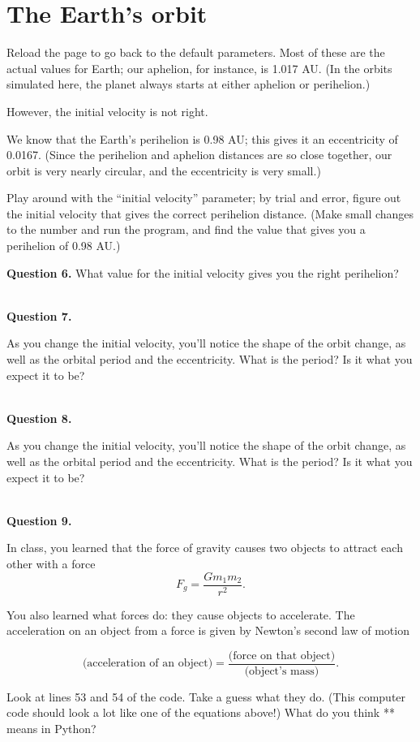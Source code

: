 \documentclass[11pt]{article}
\begin{document}
\section{The Earth's orbit}

Reload the page to go back to the default parameters. Most of these are the actual values for Earth; our aphelion, for instance, is 1.017 AU. (In the orbits simulated here, the planet always starts at either aphelion or perihelion.) 

However, the initial velocity is not right.

We know that the Earth's perihelion is 0.98 AU; this gives it an eccentricity of 0.0167. (Since the perihelion and aphelion distances are so close together, our orbit is very nearly circular, and the eccentricity is very small.)

Play around with the ``initial velocity'' parameter; by trial and error, figure out the initial velocity that gives the correct perihelion distance. (Make small changes to the number and run the program, and find the value that gives you a perihelion of 0.98 AU.)

\medskip

{\textbf{Question 6.} What value for the initial velocity gives you the right perihelion?}

\vspace*{1.5cm}
\hrulefill\\

\textbf{Question 7.} 

As you change the initial velocity, you'll notice the shape of the orbit change, as well as the orbital period and the eccentricity. What is the period? Is it what you expect it to be?

\vspace*{1.5cm}
\hrulefill\\

\textbf{Question 8.} 

As you change the initial velocity, you'll notice the shape of the orbit change, as well as the orbital period and the eccentricity. What is the period? Is it what you expect it to be?

\vspace*{1.5cm}
\hrulefill\\

\textbf{Question 9.} 

In class, you learned that the force of gravity causes two objects to attract each other with a force $$F_g = \frac{Gm_1m_2}{r^2}.$$

You also learned what forces do: they cause objects to accelerate. The acceleration on an object from a force is given by Newton's second law of motion

$$ \mbox{(acceleration of an object)} = \frac{\mbox{(force on that object)}}{\mbox{(object's mass)}}.$$

Look at lines 53 and 54 of the code. Take a guess what they do. (This computer code should look a lot like one of the equations above!) What do you think ** means in Python?

\vspace*{3cm}
\hrulefill\\
\end{document}
